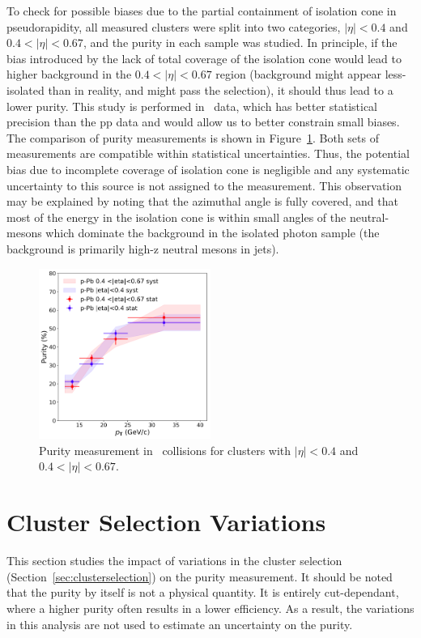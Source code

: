 To check for possible biases due to the partial containment of isolation cone in pseudorapidity, all measured clusters were split into two categories, $|\eta|<0.4$ and $0.4<|\eta|<0.67$, and the purity in each sample was studied. In principle, if the bias introduced by the lack of total coverage of the isolation cone would lead to higher background in the $0.4<|\eta|<0.67$ region (background might appear less-isolated than in reality, and might pass the selection), it should thus lead to a lower purity. This study is performed in \pPb~data, which has better statistical precision than the pp data and would allow us to better constrain small biases. The comparison of purity measurements is shown in Figure~\ref{fig:spliteta}. Both sets of measurements are compatible within statistical uncertainties. Thus, the potential bias due to incomplete coverage of isolation cone is negligible and any systematic uncertainty to this source is not assigned to the measurement. This observation may be explained by noting that the azimuthal angle is fully covered, and that most of the energy in the isolation cone is within small angles of the neutral-mesons which dominate the background in the isolated photon sample (the background is primarily high-z neutral mesons in jets). 

\begin{figure}
	\center
	\includegraphics[width=0.5\textwidth]{Checks_Systematics/SplitEtaStudy}
	\caption{Purity measurement in \pPb~collisions for clusters with $|\eta|<0.4$ and $0.4<|\eta|<0.67$.}
	\label{fig:spliteta}
\end{figure}

\section{Cluster Selection Variations}
\label{sec:clustercutselectionvariation}
This section studies the impact of variations in the cluster selection (Section~\ref{sec:clusterselection}) on the purity measurement. It should be noted that the purity by itself is not a physical quantity. It is entirely cut-dependant, where a higher purity often results in a lower efficiency. As a result, the variations in this analysis are not used to estimate an uncertainty on the purity.

